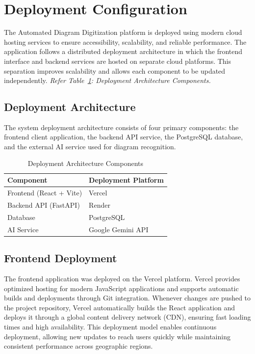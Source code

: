 \section{Deployment Configuration}
\label{sec:deployment-config}

The Automated Diagram Digitization platform is deployed using 
modern cloud hosting services to ensure accessibility, 
scalability, and reliable performance. The application follows 
a distributed deployment architecture in which the frontend 
interface and backend services are hosted on separate cloud 
platforms. This separation improves scalability and allows each 
component to be updated independently. \textit{Refer Table~\ref{tab:deployment}: Deployment Architecture Components.}

\subsection{Deployment Architecture}
\label{subsec:deployment-arch}

The system deployment architecture consists of four primary 
components: the frontend client application, the backend API 
service, the PostgreSQL database, and the external AI service 
used for diagram recognition.

\begin{table}[H]
\centering
\renewcommand{\arraystretch}{1.3}
\begin{tabular}{|l|l|}
\hline
\textbf{Component} & \textbf{Deployment Platform} \\
\hline
Frontend (React + Vite) & Vercel \\
\hline
Backend API (FastAPI) & Render \\
\hline
Database & PostgreSQL \\
\hline
AI Service & Google Gemini API \\
\hline
\end{tabular}
\caption{Deployment Architecture Components}
\label{tab:deployment}
\end{table}

\subsection{Frontend Deployment}
\label{subsec:frontend-deploy}

The frontend application was deployed on the Vercel platform. 
Vercel provides optimized hosting for modern JavaScript 
applications and supports automatic builds and deployments 
through Git integration. Whenever changes are pushed to the 
project repository, Vercel automatically builds the React 
application and deploys it through a global content delivery 
network (CDN), ensuring fast loading times and high 
availability. This deployment model enables continuous 
deployment, allowing new updates to reach users quickly while 
maintaining consistent performance across geographic 
regions.

